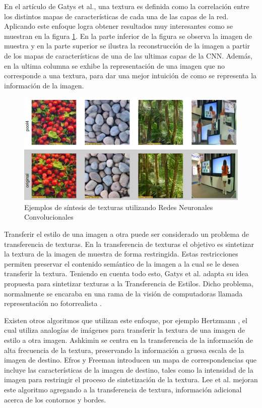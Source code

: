 \documentclass[a4paper,11pt,spanish]{book}
\begin{document}
      En el artículo de Gatys et al., una textura es definida como la correlación entre los distintos mapas de características de cada una de las capas de la red. Aplicando este enfoque
      logra obtener resultados muy interesantes como se muestran en la figura \ref{fig:textures}. En la parte inferior de la figura se observa la imagen de muestra y en la parte superior
      se ilustra la reconstrucción de la imagen a partir de los mapas de características de una de las ultimas capas de la CNN. Además, en la ultima columna se exhibe la representación
      de una imagen que no corresponde a una textura, para dar una mejor intuición de como se representa la información de la imagen.

      \begin{figure}[H]
	\begin{center}
	  \includegraphics[width=0.8\linewidth]{./img/textures.png}
	\end{center}
	\caption{Ejemplos de síntesis de texturas utilizando Redes Neuronales Convolucionales}
	\label{fig:textures}
      \end{figure}      
      
      Transferir el estilo de una imagen a otra puede ser considerado un problema de transferencia de texturas. 
      En la transferencia de texturas el objetivo es sintetizar la textura de la imagen de muestra de forma restringida.
      Estas restricciones permiten preservar el contenido semántico de la imagen a la cual se le desea transferir la textura.
      Teniendo en cuenta todo esto, Gatys et al. adapta su idea propuesta para sintetizar texturas a la Transferencia de Estilos.
      Dicho problema, normalmente se encaraba en una rama de la visión de computadoras llamada representación no fotorrealista \cite{Kyprianidis:ArtisticStylization}.
      
      Existen otros algoritmos que utilizan este enfoque, por ejemplo 
      Hertzmann \cite{Hertzmann:ImageAnalogies}, el cual utiliza analogías de imágenes para transferir la textura de una imagen de estilo a otra imagen. 
      Ashkimin \cite{Ashikhmin:FastTextureTransfer} se centra en la transferencia de la información de alta frecuencia de la textura, preservando la información a gruesa escala de 
      la imagen de destino. 
      Efros y Freeman \cite{Efros:ImageQuilting} introducen un mapa de correspondencias que incluye las características de la imagen de destino, tales como la intensidad 
      de la imagen para restringir el proceso de sintetización de la textura.
      Lee et al. \cite{Lee:DirectionalTextureTransfer} mejoran este algoritmo agregando a la transferencia de textura, información adicional acerca de los contornos y bordes.
      
\end{document}
